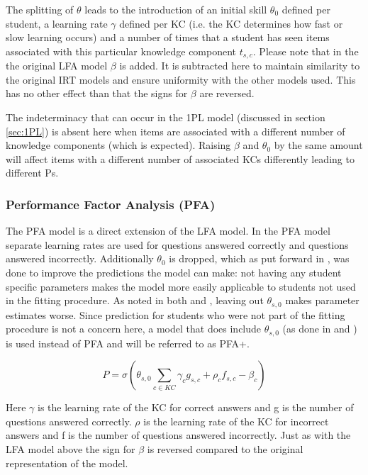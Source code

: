 \documentclass{scrartcl}
\begin{document}
The splitting of $\theta$ leads to the introduction of an initial skill $\theta_{0}$ defined per student, a learning rate $\gamma$ defined per KC (i.e. the KC determines how fast or slow learning occurs) and a number of times that a student has seen items associated with this particular knowledge component $t_{s,c}$. Please note that in the the original LFA model $\beta$ is added. It is subtracted here to maintain similarity to the original IRT models and ensure uniformity with the other models used. This has no other effect than that the signs for $\beta$ are reversed.

The indeterminacy that can occur in the 1PL model (discussed in section \ref{sec:1PL}) is absent here when items are associated with a different number of knowledge components (which is expected). Raising $\beta$ and $\theta_{0}$ by the same amount will affect items with a different number of associated KCs differently leading to different Ps. 



\subsubsection{Performance Factor Analysis (PFA)}
\label{sec:pfa}
The PFA model is a direct extension of the LFA model. In the PFA model separate learning rates are used for questions answered correctly and questions answered incorrectly. Additionally $\theta_{0}$ is dropped, which as put forward in \cite{pfa}, was done to improve the predictions the model can make: not having any student specific parameters makes the model more easily applicable to students not used in the fitting procedure. As noted in both \cite{ktpfa} and \cite{blackart}, leaving out $\theta_{s,0}$ makes parameter estimates worse. Since prediction for students who were not part of the fitting procedure is not a concern here, a model that does include $\theta_{s,0}$ (as done in \cite{ktpfa} and \cite{blackart}) is used instead of PFA and will be referred to as PFA+.

\begin{equation}
\label{eq:pfa}
P = \sigma(\theta_{s,0} \sum_{c \in KC}  \gamma_{c} g_{s,c} + \rho_{c} f_{s,c} - \beta_{c})
\end{equation}


Here $\gamma$ is the learning rate of the KC for correct answers and g is the number of questions answered correctly. $\rho$ is the learning rate of the KC for incorrect answers and f is the number of questions answered incorrectly. Just as with the LFA model above the sign for $\beta$ is reversed compared to the original representation of the model.
\end{document}
